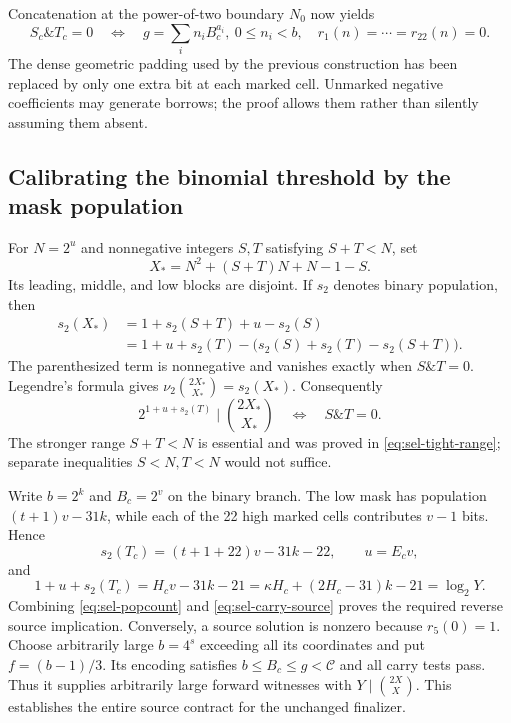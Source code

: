 Concatenation at the power-of-two boundary $N_0$ now yields
\begin{equation}\label{eq:sel-carry-source}
 S_c\mathbin{\&}T_c=0
 \quad\Longleftrightarrow\quad
 g=\sum_i n_iB_c^{a_i},\ 0\le n_i<b,\quad r_1(n)=\cdots=r_{22}(n)=0.
\end{equation}
The dense geometric padding used by the previous construction has been
replaced by only one extra bit at each marked cell. Unmarked negative
coefficients may generate borrows; the proof allows them rather than
silently assuming them absent.

\subsection{Calibrating the binomial threshold by the mask population}

For $N=2^u$ and nonnegative integers $S,T$ satisfying $S+T<N$, set
\[
 X_*=N^2+(S+T)N+N-1-S.
\]
Its leading, middle, and low blocks are disjoint. If $s_2$ denotes binary
population, then
\begin{align*}
 s_2(X_*)&=1+s_2(S+T)+u-s_2(S)\\
 &=1+u+s_2(T)-\bigl(s_2(S)+s_2(T)-s_2(S+T)\bigr).
\end{align*}
The parenthesized term is nonnegative and vanishes exactly when
$S\mathbin{\&}T=0$. Legendre's formula gives
$\nu_2\binom{2X_*}{X_*}=s_2(X_*)$. Consequently
\begin{equation}\label{eq:sel-popcount}
 2^{1+u+s_2(T)}\mid\binom{2X_*}{X_*}
 \quad\Longleftrightarrow\quad S\mathbin{\&}T=0.
\end{equation}
The stronger range $S+T<N$ is essential and was proved in
\eqref{eq:sel-tight-range}; separate inequalities $S<N,T<N$ would not suffice.

Write $b=2^k$ and $B_c=2^v$ on the binary branch. The low mask has
population $(t+1)v-31k$, while each of the 22 high marked cells contributes
$v-1$ bits. Hence
\[
 s_2(T_c)=(t+1+22)v-31k-22,\qquad u=E_cv,
\]
and
\[
 1+u+s_2(T_c)=H_cv-31k-21
 =\kappa H_c+(2H_c-31)k-21=\log_2Y.
\]
Combining \eqref{eq:sel-popcount} and \eqref{eq:sel-carry-source} proves
the required reverse source implication. Conversely, a source solution
is nonzero because $r_5(0)=1$. Choose arbitrarily large $b=4^s$ exceeding
all its coordinates and put $f=(b-1)/3$. Its encoding satisfies
$b\le B_c\le g<\mathcal C$ and all carry tests pass. Thus it supplies
arbitrarily large forward witnesses with $Y\mid\binom{2X}{X}$.
This establishes the entire source contract for the unchanged finalizer.

